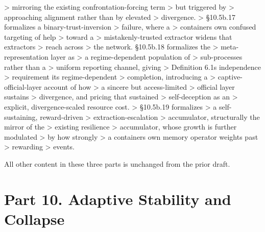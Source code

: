 \documentclass[
]{article}
\begin{document}
\begin{itemize}
  \textgreater{} mirroring the existing confrontation-forcing term
  \textgreater{} but triggered by \textgreater{} approaching alignment
  rather than by elevated \textgreater{} divergence. \textgreater{}
  §10.5b.17 formalizes a binary-trust-inversion \textgreater{} failure,
  where a \textgreater{} container\textquotesingle s own confused
  targeting of help \textgreater{} toward a \textgreater{}
  mistakenly-trusted extractor widens that extractor\textquotesingle s
  \textgreater{} reach across \textgreater{} the network. §10.5b.18
  formalizes the \textgreater{} meta-representation layer as
  \textgreater{} a regime-dependent population of \textgreater{}
  sub-processes rather than a \textgreater{} uniform reporting channel,
  giving \textgreater{} Definition 6.1\textquotesingle s independence
  \textgreater{} requirement its regime-dependent \textgreater{}
  completion, introducing a \textgreater{} captive-official-layer
  account of how \textgreater{} a sincere but access-limited
  \textgreater{} official layer sustains \textgreater{} divergence, and
  pricing that sustained \textgreater{} self-deception as an
  \textgreater{} explicit, divergence-scaled resource cost.
  \textgreater{} §10.5b.19 formalizes \textgreater{} a self-sustaining,
  reward-driven \textgreater{} extraction-escalation \textgreater{}
  accumulator, structurally the mirror of the \textgreater{} existing
  resilience \textgreater{} accumulator, whose growth is further
  modulated \textgreater{} by how strongly \textgreater{} a
  container\textquotesingle s own memory operator weights past
  \textgreater{} rewarding \textgreater{} events.
\end{itemize}

All other content in these three parts is unchanged from the prior
draft.

\hypertarget{part-10.-adaptive-stability-and-collapse}{%
\section{Part 10. Adaptive Stability and
Collapse}\label{part-10.-adaptive-stability-and-collapse}}
\end{document}
